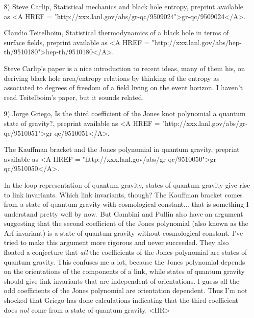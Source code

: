8) Steve Carlip, Statistical mechanics and black hole entropy, preprint
available as <A HREF =
"http://xxx.lanl.gov/abs/gr-qc/9509024">gr-qc/9509024</A>. 

Claudio Teitelboim, Statistical thermodynamics of a black hole in
terms of surface fields, preprint available as <A HREF =
"http://xxx.lanl.gov/abs/hep-th/9510180">hep-th/9510180</A>. 
 
Steve Carlip's paper is a nice introduction to recent ideas, many of
them his, on deriving black hole area/entropy relations by thinking of
the entropy as associated to degrees of freedom of a field living on the
event horizon.  I haven't read Teitelboim's paper, but it sounds related.


9) Jorge Griego, Is the third coefficient of the Jones knot polynomial a
quantum state of gravity?, preprint available as <A HREF =
"http://xxx.lanl.gov/abs/gr-qc/9510051">gr-qc/9510051</A>.   

The Kauffman bracket and the Jones polynomial in quantum gravity,
preprint available as <A HREF =
"http://xxx.lanl.gov/abs/gr-qc/9510050">gr-qc/9510050</A>.  



In the loop representation of quantum gravity, states of quantum gravity
give rise to link invariants.  Which link invariants, though?  The
Kauffman bracket comes from a state of quantum gravity with cosmological
constant... that is something I understand pretty well by now.  But
Gambini and Pullin also have an argument suggesting that the second
coefficient of the Jones polynomial (also known as the Arf invariant) is
a state of quantum gravity without cosmological constant.  I've tried to
make this argument more rigorous and never succeeded.  They also floated a
conjecture that \emph{all} the coefficients of the Jones polynomial are
states of quantum gravity.  This confuses me a lot, because the Jones
polynomial depends on the orientations of the components of a link,
while states of quantum gravity should give link invariants that are
independent of orientations.  I guess all the odd coefficients of the
Jones polynomial are orientation dependent.  Thus I'm not shocked that
Griego has done calculations indicating that the third coefficient does
\emph{not} come from a state of quantum gravity.  
<HR>



